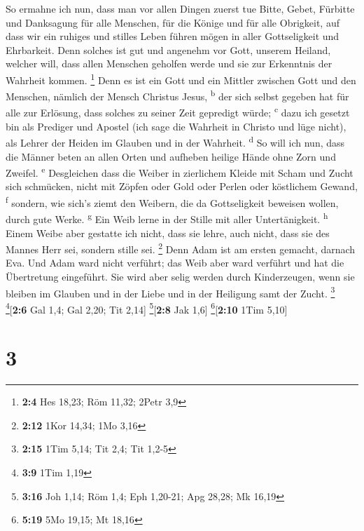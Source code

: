  So ermahne ich nun, dass man vor allen Dingen zuerst tue
Bitte, Gebet, Fürbitte und Danksagung für alle Menschen, 
für die Könige und für alle Obrigkeit, auf dass wir ein ruhiges und
stilles Leben führen mögen in aller Gottseligkeit und Ehrbarkeit.
 Denn solches ist gut und angenehm vor Gott, unserem
Heiland,  welcher will, dass allen Menschen geholfen werde
und sie zur Erkenntnis der Wahrheit kommen. \footnote{\textbf{2:4} Hes
  18,23; Röm 11,32; 2Petr 3,9}  Denn es ist ein Gott und
ein Mittler zwischen Gott und den Menschen, nämlich der Mensch Christus
Jesus, \textsuperscript{b}  der sich selbst gegeben hat
für alle zur Erlösung, dass solches zu seiner Zeit gepredigt würde;
\textsuperscript{c}  dazu ich gesetzt bin als Prediger und
Apostel (ich sage die Wahrheit in Christo und lüge nicht), als Lehrer
der Heiden im Glauben und in der Wahrheit. \textsuperscript{d}
 So will ich nun, dass die Männer beten an allen Orten und
aufheben heilige Hände ohne Zorn und Zweifel. \textsuperscript{e}
 Desgleichen dass die Weiber in zierlichem Kleide mit
Scham und Zucht sich schmücken, nicht mit Zöpfen oder Gold oder Perlen
oder köstlichem Gewand, \textsuperscript{f}  sondern, wie
sich's ziemt den Weibern, die da Gottseligkeit beweisen wollen, durch
gute Werke. \textsuperscript{g}  Ein Weib lerne in der
Stille mit aller Untertänigkeit. \textsuperscript{h} 
Einem Weibe aber gestatte ich nicht, dass sie lehre, auch nicht, dass
sie des Mannes Herr sei, sondern stille sei. \footnote{\textbf{2:12}
  1Kor 14,34; 1Mo 3,16}  Denn Adam ist am ersten gemacht,
darnach Eva.  Und Adam ward nicht verführt; das Weib aber
ward verführt und hat die Übertretung eingeführt.  Sie
wird aber selig werden durch Kinderzeugen, wenn sie bleiben im Glauben
und in der Liebe und in der Heiligung samt der Zucht. \footnote{\textbf{2:15}
  1Tim 5,14; Tit 2,4; Tit 1,2-5} \footnote{\textbf{3:9} 1Tim 1,19}{[}\textbf{2:6}
Gal 1,4; Gal 2,20; Tit 2,14{]} \footnote{\textbf{3:16} Joh 1,14; Röm
  1,4; Eph 1,20-21; Apg 28,28; Mk 16,19}{[}\textbf{2:8} Jak 1,6{]}
\footnote{\textbf{5:19} 5Mo 19,15; Mt 18,16}{[}\textbf{2:10} 1Tim
5,10{]}

\hypertarget{section-2}{%
\section{3}\label{section-2}}

